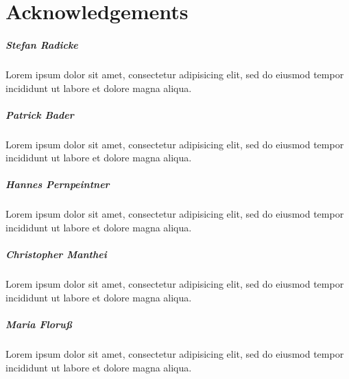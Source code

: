 
\chapter*{Acknowledgements}
\label{cha:Acknowledgements}

\paragraph{Stefan Radicke}
  Lorem ipsum dolor sit amet, consectetur adipisicing elit, sed do eiusmod
  tempor incididunt ut labore et dolore magna aliqua.

\paragraph{Patrick Bader}
  Lorem ipsum dolor sit amet, consectetur adipisicing elit, sed do eiusmod
  tempor incididunt ut labore et dolore magna aliqua.

\paragraph{Hannes Pernpeintner}
  Lorem ipsum dolor sit amet, consectetur adipisicing elit, sed do eiusmod
  tempor incididunt ut labore et dolore magna aliqua.

\paragraph{Christopher Manthei}
  Lorem ipsum dolor sit amet, consectetur adipisicing elit, sed do eiusmod
  tempor incididunt ut labore et dolore magna aliqua.

\paragraph{Maria Floruß}
  Lorem ipsum dolor sit amet, consectetur adipisicing elit, sed do eiusmod
  tempor incididunt ut labore et dolore magna aliqua.
